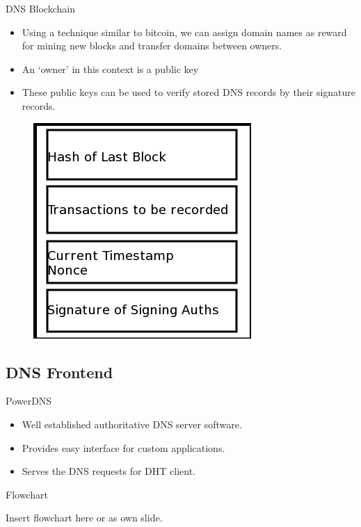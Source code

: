\documentclass[11pt]{beamer}
\begin{document}
\begin{frame}{DNS Blockchain}
	\begin{itemize}
		\item Using a technique similar to bitcoin, we can assign domain names as reward for mining new blocks and transfer domains between owners.
		
		\item An `owner' in this context is a public key
		
		\item These public keys can be used to verify stored DNS records by their signature records.
	\end{itemize}
	
	
	\begin{figure}
		\centering
		\includegraphics[width=0.3\linewidth]{namecoin_block}
		\label{fig:blockchain}
	\end{figure}
	
\end{frame}




\subsection{DNS Frontend}
\begin{frame}{PowerDNS}
\begin{itemize}
	\item Well established authoritative DNS server software.	
	\item Provides easy interface for custom applications.
	\item Serves the DNS requests for DHT client.
\end{itemize}

\end{frame}

\begin{frame}{Flowchart}
	
	Insert flowchart here or as own slide.
	
\end{frame}
\end{document}

